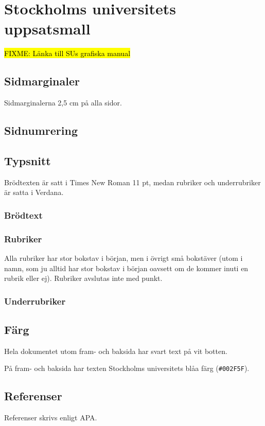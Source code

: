 
\section{Stockholms universitets uppsatsmall}
\label{utseende}

\hl{FIXME: Länka till SUs grafiska manual}


\subsection{Sidmarginaler}

Sidmarginalerna 2,5 cm på alla sidor.


\subsection{Sidnumrering}


\subsection{Typsnitt}

Brödtexten är satt i Times New Roman 11 pt, medan rubriker och underrubriker är
satta i Verdana.


\subsubsection{Brödtext}


\subsubsection{Rubriker}

Alla rubriker har stor bokstav i början, men i övrigt små bokstäver (utom i
namn, som ju alltid har stor bokstav i början oavsett om de kommer inuti en
rubrik eller ej). Rubriker avslutas inte med punkt.


\subsubsection{Underrubriker}


\subsection{Färg}

Hela dokumentet utom fram- och baksida har svart text på vit botten.

På fram- och baksida har texten Stockholms universitets blåa färg
(\texttt{\#002F5F}).


\subsection{Referenser}

Referenser skrivs enligt APA.

